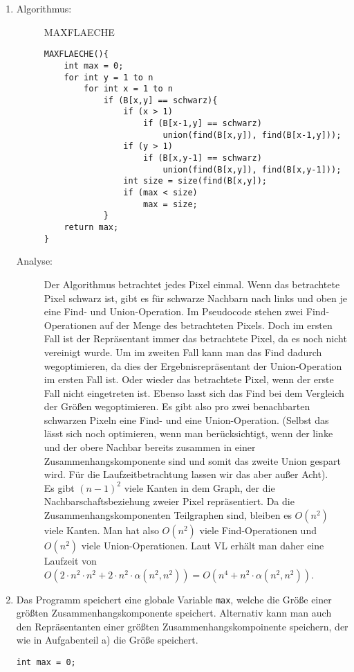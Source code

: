 \documentclass[a4paper,10pt]{article}
\begin{document}
\begin{enumerate}
\item \begin{description}
	\item[Algorithmus:] MAXFLAECHE \begin{lstlisting}
MAXFLAECHE(){
	int max = 0;
	for int y = 1 to n
		for int x = 1 to n
			if (B[x,y] == schwarz){
				if (x > 1)
					if (B[x-1,y] == schwarz)
						union(find(B[x,y]), find(B[x-1,y]));
				if (y > 1)
					if (B[x,y-1] == schwarz)
						union(find(B[x,y]), find(B[x,y-1]));
				int size = size(find(B[x,y]);
				if (max < size)
					max = size;
			}
	return max;
}
	\end{lstlisting}
\item[Analyse:] Der Algorithmus betrachtet jedes Pixel einmal. Wenn das betrachtete Pixel schwarz ist, gibt es für schwarze Nachbarn nach links und oben je eine Find- und Union-Operation. Im Pseudocode stehen zwei Find-Operationen auf der Menge des betrachteten Pixels. Doch im ersten Fall ist der Repräsentant immer das betrachtete Pixel, da es noch nicht vereinigt wurde. Um im zweiten Fall kann man das Find dadurch wegoptimieren, da dies der Ergebnisrepräsentant der Union-Operation im ersten Fall ist. Oder wieder das betrachtete Pixel, wenn der erste Fall nicht eingetreten ist. Ebenso lasst sich das Find bei dem Vergleich der Größen wegoptimieren. Es gibt also pro zwei benachbarten schwarzen Pixeln eine Find- und eine Union-Operation. (Selbst das lässt sich noch optimieren, wenn man berücksichtigt, wenn der linke und der obere Nachbar bereits zusammen in einer Zusammenhangskomponente sind und somit das zweite Union gespart wird. Für die Laufzeitbetrachtung lassen wir das aber außer Acht).\\
Es gibt $(n-1)^2$ viele Kanten in dem Graph, der die Nachbarschaftsbeziehung zweier Pixel repräsentiert. Da die Zusammenhangskomponenten Teilgraphen sind, bleiben es $O(n^2)$ viele Kanten. Man hat also $O(n^2)$ viele Find-Operationen und $O(n^2)$ viele Union-Operationen. Laut VL erhält man daher eine Laufzeit von $O(2 \cdot n^2 \cdot n^2 + 2 \cdot n^2 \cdot \alpha (n^2,n^2)) = O(n^4 + n^2 \cdot \alpha (n^2,n^2))$.
\end{description}
\item Das Programm speichert eine globale Variable \texttt{max}, welche die Größe einer größten Zusammenhangskomponente speichert. Alternativ kann man auch den Repräsentanten einer größten Zusammenhangskompoinente speichern, der wie in Aufgabenteil a) die Größe speichert.\begin{lstlisting}
int max = 0;


\end{lstlisting}
\end{enumerate}
\end{document}
